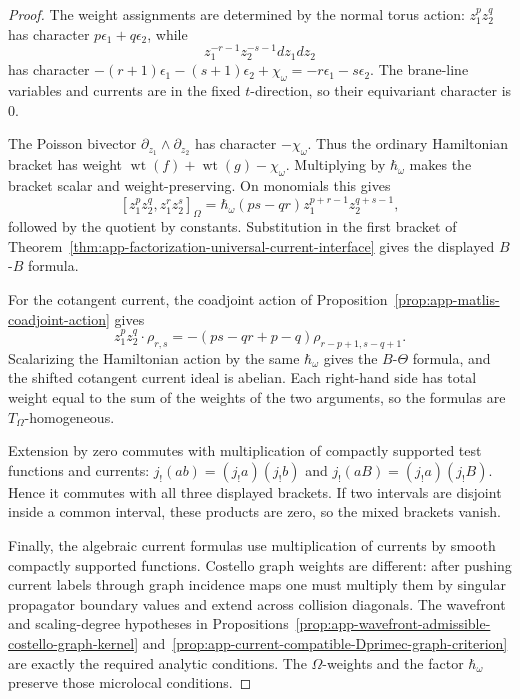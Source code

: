 \begin{proof}
  The weight assignments are determined by the normal torus action:
  \(z_1^pz_2^q\) has character \(p\epsilon_1+q\epsilon_2\), while
  \[
    z_1^{-r-1}z_2^{-s-1}dz_1dz_2
  \]
  has character
  \(-(r+1)\epsilon_1-(s+1)\epsilon_2+\chi_\omega
  =-r\epsilon_1-s\epsilon_2\).  The brane-line variables and currents are
  in the fixed \(t\)-direction, so their equivariant character is \(0\).

  The Poisson bivector
  \(\partial_{z_1}\wedge\partial_{z_2}\) has character
  \(-\chi_\omega\).  Thus the ordinary Hamiltonian bracket has weight
  \(\operatorname{wt}(f)+\operatorname{wt}(g)-\chi_\omega\).  Multiplying by
  \(\hbar_\omega\) makes the bracket scalar and weight-preserving.  On
  monomials this gives
  \[
    [z_1^pz_2^q,z_1^rz_2^s]_\Omega
      =
      \hbar_\omega(ps-qr)z_1^{p+r-1}z_2^{q+s-1},
  \]
  followed by the quotient by constants.  Substitution in the first
  bracket of
  Theorem~\ref{thm:app-factorization-universal-current-interface} gives
  the displayed \(B\)-\(B\) formula.

  For the cotangent current, the coadjoint action of
  Proposition~\ref{prop:app-matlis-coadjoint-action} gives
  \[
    z_1^pz_2^q\cdot\rho_{r,s}
      =
      -(ps-qr+p-q)\rho_{r-p+1,s-q+1}.
  \]
  Scalarizing the Hamiltonian action by the same \(\hbar_\omega\) gives
  the \(B\)-\(\Theta\) formula, and the shifted cotangent current ideal is
  abelian.  Each right-hand side has total weight equal to the sum of the
  weights of the two arguments, so the formulas are
  \(T_\Omega\)-homogeneous.

  Extension by zero commutes with multiplication of compactly supported
  test functions and currents:
  \(j_!(ab)=(j_!a)(j_!b)\) and
  \(j_!(aB)=(j_!a)(j_!B)\).  Hence it commutes with all three displayed
  brackets.  If two intervals are disjoint inside a common interval, these
  products are zero, so the mixed brackets vanish.

  Finally, the algebraic current formulas use multiplication of currents
  by smooth compactly supported functions.  Costello graph weights are
  different: after pushing current labels through graph incidence maps one
  must multiply them by singular propagator boundary values and extend
  across collision diagonals.  The wavefront and scaling-degree hypotheses
  in
  Propositions~\ref{prop:app-wavefront-admissible-costello-graph-kernel}
  and~\ref{prop:app-current-compatible-Dprimec-graph-criterion} are exactly
  the required analytic conditions.  The \(\Omega\)-weights and the factor
  \(\hbar_\omega\) preserve those microlocal conditions.
\end{proof}

